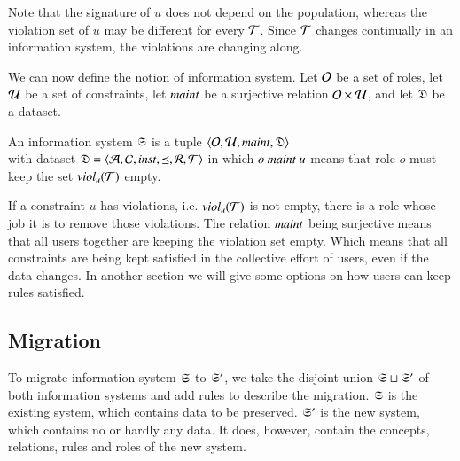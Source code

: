 \documentclass{elsarticle}
\begin{document}
	Note that the signature of $u$ does not depend on the population, whereas the violation set of $u$ may be different for every $\mathcal{T}$.
	Since $\mathcal{T}$ changes continually in an information system, the violations are changing along. 

	We can now define the notion of information system.
	Let $\mathcal{O}$ be a set of roles,
	let $\mathcal{U}$ be a set of constraints, 
	let $\text{\it maint\/}$ be a surjective relation $\mathcal{O}\times\mathcal{U}$,
	and let $\mathfrak{D}$ be a dataset.
\begin{definition}
	\label{def:information system}
	\item An information system $\mathfrak{S}$ is a tuple $\langle\mathcal{O},\mathcal{U},\text{\it maint\/},\mathfrak{D}\rangle$\\
	with dataset $\mathfrak{D}=\langle\mathcal{A},\mathcal{C},\text{\it inst\/},\preceq,\mathcal{R},\mathcal{T}\rangle$
	in which $o\ \text{\it maint\/}\ u$ means that role $o$ must keep the set $\text{\it viol\/}_{u}(\mathcal{T})$ empty.
\end{definition}
	If a constraint $u$ has violations, i.e. $\text{\it viol\/}_{u}(\mathcal{T})$ is not empty, there is a role whose job it is to remove those violations.
	The relation $\text{\it maint\/}$ being surjective means that all users together are keeping the violation set empty.
	Which means that all constraints are being kept satisfied in the collective effort of users, even if the data changes.
	In another section we will give some options on how users can keep rules satisfied.

\subsection{Migration}
	To migrate information system $\mathfrak{S}$ to $\mathfrak{S}'$, we take the disjoint union $\mathfrak{S}\sqcup\mathfrak{S}'$ of both information systems
	and add rules to describe the migration.
	$\mathfrak{S}$ is the existing system, which contains data to be preserved.
	$\mathfrak{S}'$ is the new system, which contains no or hardly any data.
	It does, however, contain the concepts, relations, rules and roles of the new system.
	
\end{document}
